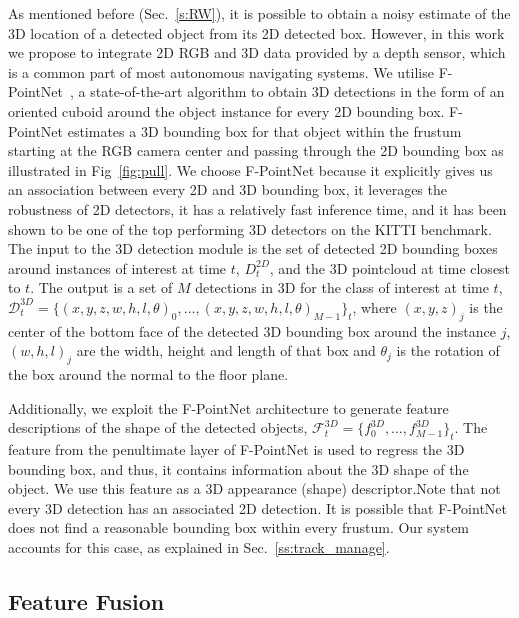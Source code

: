 \documentclass[letterpaper, 10 pt, conference]{ieeeconf}
\begin{document}
As mentioned before (Sec.~\ref{s:RW}), it is possible to obtain a noisy estimate of the 3D location of a detected object from its 2D detected box. However, in this work we propose to integrate 2D RGB and 3D data provided by a depth sensor, which is a common part of most autonomous navigating systems. 
We utilise F-PointNet~\cite{DBLP:journals/corr/abs-1711-08488}, a state-of-the-art algorithm to obtain 3D detections in the form of an oriented cuboid around the object instance for every 2D bounding box. F-PointNet estimates a 3D bounding box for that object within the frustum starting at the RGB camera center and passing through the 2D bounding box as illustrated in Fig~\ref{fig:pull}. We choose F-PointNet because it explicitly gives us an association between every 2D and 3D bounding box, it leverages the robustness of 2D detectors, it has a relatively fast inference time, and it has been shown to be one of the top performing 3D detectors on the KITTI benchmark.
The input to the 3D detection module is the set of detected 2D bounding boxes around instances of interest at time $t$, $D^{2D}_t$, and the 3D pointcloud at time closest to $t$. 
The output is a set of $M$ detections in 3D for the class of interest at time $t$, $\mathcal{D}^{3D}_t = \{(x,y,z,w,h,l,\theta)_{0},\ldots,(x,y,z,w,h,l,\theta)_{M-1}\}_t$, where $(x,y,z)_j$ is the center of the bottom face of the detected 3D bounding box around the instance $j$, $(w,h,l)_j$ are the width, height and length of that box and $\theta_j$ is the rotation of the box around the normal to the floor plane.

Additionally, we exploit the F-PointNet architecture to generate feature descriptions of the shape of the detected objects, $\mathcal{F}^{3D}_t = \{f^{3D}_{0},\ldots,f^{3D}_{M-1}\}_t$.
The feature from the penultimate layer of F-PointNet is used to regress the 3D bounding box, and thus, it contains information about the 3D shape of the object. We use this feature as a 3D appearance (shape) descriptor.Note that not every 3D detection has an associated 2D detection. It is possible that F-PointNet does not find a reasonable bounding box within every frustum. Our system accounts for this case, as explained in Sec.~\ref{ss:track_manage}.




\subsection{Feature Fusion}
\label{ss:ff}
\end{document}

